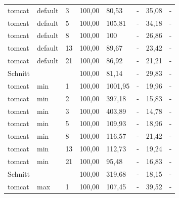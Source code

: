 \begin{footnotesize}
\begin{longtable}{llllllll}
		tomcat         & default & 3          & 100,00 & 80,53                       & -                              & 35,08  & -      \\
		tomcat         & default & 5          & 100,00 & 105,81                      & -                              & 34,18  & -      \\
		tomcat         & default & 8          & 100,00 & \cellcolor[HTML]{C0C0C0}100 & -                              & 26,86  & -      \\
		tomcat         & default & 13         & 100,00 & 89,67                       & -                              & 23,42  & -      \\
		tomcat         & default & 21         & 100,00 & 86,92                       & -                              & 21,21  & -      \\ \hline
		Schnitt        &         &            & 100,00 & 81,14                       & -                              & 29,83  & -      \\ \hline
		tomcat         & min     & 1          & 100,00 & 1001,95                     & -                              & 19,96  & -      \\
		tomcat         & min     & 2          & 100,00 & 397,18                      & -                              & 15,83  & -      \\
		tomcat         & min     & 3          & 100,00 & 403,89                      & -                              & 14,78  & -      \\
		tomcat         & min     & 5          & 100,00 & 109,93                      & -                              & 18,96  & -      \\
		tomcat         & min     & 8          & 100,00 & 116,57                      & -                              & 21,42  & -      \\
		tomcat         & min     & 13         & 100,00 & 112,73                      & -                              & 19,24  & -      \\
		tomcat         & min     & 21         & 100,00 & 95,48                       & -                              & 16,83  & -      \\ \hline
		Schnitt        &         &            & 100,00 & 319,68                      & -                              & 18,15  & -      \\ \hline
		tomcat         & max     & 1          & 100,00 & 107,45                      & -                              & 39,52  & -      \\

\end{longtable}
\end{footnotesize}
